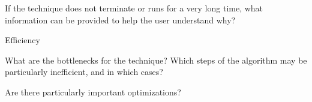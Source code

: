 \documentclass[a4paper]{article}
\begin{document}
\begin{minipage}[t]{0.16\linewidth}
\begin{betterlist}
\begin{betterlist}
			\item If the technique does not terminate or runs for a very long time, what information can be provided to help the user understand why?

		\end{betterlist}
		\item \alert{Efficiency}
		\begin{betterlist}
			\item What are the bottlenecks for the technique? Which steps of the algorithm may be particularly inefficient, and in which cases?

			\item Are there particularly important optimizations?


\end{betterlist}
\end{betterlist}
\end{minipage}
\end{document}
